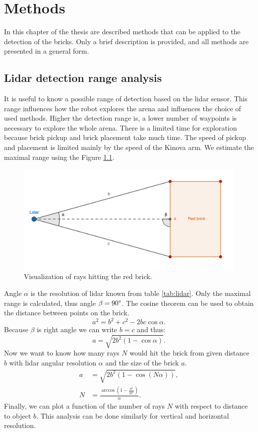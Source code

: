 \chapter{Methods}
In this chapter of the thesis are described methods that can be applied to the detection of the bricks. Only a brief description is provided, and all methods are presented in a general form.

\section{Lidar detection range analysis}
It is useful to know a possible range of detection based on the lidar sensor. This range influences how the robot explores the arena and influences the choice of used methods. Higher the detection range is, a lower number of waypoints is necessary to explore the whole arena. There is a limited time for exploration because brick pickup and brick placement take much time. The speed of pickup and placement is limited mainly by the speed of the Kinova arm. We estimate the maximal range using the Figure \ref{fig:range}.

\begin{figure}[H]
	\centering
	\includegraphics[scale=1.1]{fig/lidar_range.png}
	\caption[Lidar range study]{Visualization of rays hitting the red brick.}
	\label{fig:range}
\end{figure}

Angle $\alpha$ is the resolution of lidar known from table \ref{tab:lidar}. Only the maximal range is calculated, thus angle $\beta = 90\degree$. The cosine theorem can be used to obtain the distance between points on the brick.
\begin{equation}
a^2 = b^2 + c^2 - 2bc \cos \alpha.
\end{equation}
Because $\beta$ is right angle we can write $b = c$ and thus:
\begin{equation}
a = \sqrt{2b^2 \left(1-\cos \alpha \right)}.
\end{equation}
Now we want to know how many rays $N$ would hit the brick from given distance $b$ with lidar angular resolution $\alpha$ and the size of the brick $a$. 
\begin{align}
a &= \sqrt{2b^2 \left(1-\cos \left( N \alpha \right) \right)}, \\
N &= \frac{\arccos\left(1-\frac{a^2}{2b^2}\right) }{\alpha}.
\label{eq:rays}
\end{align}
Finally, we can plot a function of the number of rays $N$ with respect to distance to object $b$. This analysis can be done similarly for vertical and horizontal resolution.

